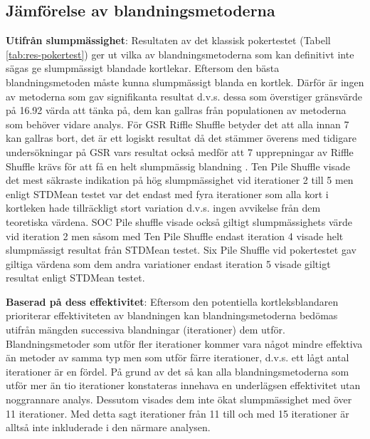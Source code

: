 \documentclass[swedish,a4paper]{article}
\begin{document}

\subsection{Jämförelse av blandningsmetoderna}
\label{sec:d_bm_jbm}
\textbf{Utifrån slumpmässighet}: Resultaten av det klassisk pokertestet (Tabell
\ref{tab:res-pokertest}) ger ut vilka av blandningsmetoderna som kan definitivt
inte sägas ge slumpmässigt blandade kortlekar.
Eftersom den bästa blandningsmetoden måste kunna slumpmässigt blanda en kortlek.
Därför är ingen av metoderna som gav signifikanta resultat d.v.s. dessa som
överstiger gränsvärde på 16.92 värda att tänka på, dem kan gallras från
populationen av metoderna som behöver vidare analys. För GSR Riffle Shuffle
betyder det att alla innan 7 kan gallras bort, det är ett logiskt resultat då det
stämmer överens med tidigare undersökningar på GSR vars resultat också medför
att 7 upprepningar av Riffle Shuffle krävs för att få en helt slumpmässig
blandning \parencite{dovetaillair}. Ten Pile Shuffle visade det mest säkraste
indikation på hög slumpmässighet vid iterationer 2 till 5 men enligt
STDMean testet var det endast med fyra iterationer som alla kort i kortleken hade tillräckligt stort variation d.v.s. ingen avvikelse från dem teoretiska värdena.
SOC Pile shuffle visade också giltigt slumpmässighets värde vid iteration 2 men
såsom med Ten Pile Shuffle endast iteration 4 visade helt slumpmässigt resultat
från STDMean testet. Six Pile Shuffle vid pokertestet gav giltiga värdena som
dem andra variationer endast iteration 5 visade giltigt resultat enligt STDMean
testet.  


\textbf{Baserad på dess effektivitet}: Eftersom 
den potentiella kortleksblandaren prioriterar effektiviteten av blandningen kan blandningsmetoderna bedömas utifrån mängden successiva blandningar (iterationer) dem utför. Blandningsmetoder som utför fler iterationer kommer vara något mindre effektiva än metoder av samma typ men som utför färre iterationer, d.v.s. ett lågt antal iterationer är en fördel. På grund av det så kan alla blandningsmetoderna som utför mer än tio iterationer konstateras innehava en underlägsen effektivitet utan noggrannare analys. Dessutom visades dem inte ökat slumpmässighet med över 11
iterationer. Med detta sagt iterationer från 11 till och med 15 iterationer är
alltså inte inkluderade i den närmare analysen.
\end{document}
